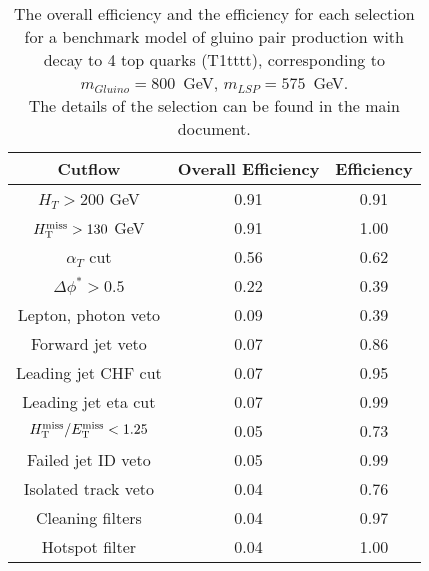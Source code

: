 \begin{longtable}{| c | c | c  | }
\caption{The overall efficiency and the efficiency for each selection for a benchmark model 
  of gluino pair production with decay to 4 top quarks
  (T1tttt), corresponding to $m_{Gluino} = 800 $~GeV, $m_{LSP} = 575$~GeV. \\
  The details of the selection can be found in the main document. \label{tab:T1tttt_800_575}} \\    \hline 
\textbf{Cutflow} & \textbf{Overall Efficiency} & \textbf{Efficiency}\\ \hline 
$H_{T} > 200$ GeV & 0.91 & 0.91\\ \hline 
$H_{\rm T}^{\rm miss} > 130$ GeV & 0.91 & 1.00\\ \hline 
$\alpha_{T}$ cut & 0.56 & 0.62\\ \hline 
$\Delta\phi^{*} > 0.5$ & 0.22 & 0.39\\ \hline 
Lepton, photon veto & 0.09 & 0.39\\ \hline 
Forward jet veto & 0.07 & 0.86\\ \hline 
Leading jet CHF cut & 0.07 & 0.95\\ \hline 
Leading jet eta cut & 0.07 & 0.99\\ \hline 
$H_{\rm T}^{\rm miss} / E_{\rm T}^{\rm miss} < 1.25$ & 0.05 & 0.73\\ \hline 
Failed jet ID veto & 0.05 & 0.99\\ \hline 
Isolated track veto & 0.04 & 0.76\\ \hline 
Cleaning filters & 0.04 & 0.97\\ \hline 
Hotspot filter & 0.04 & 1.00\\ \hline 
    \hline 
    \hline 
\end{longtable}
